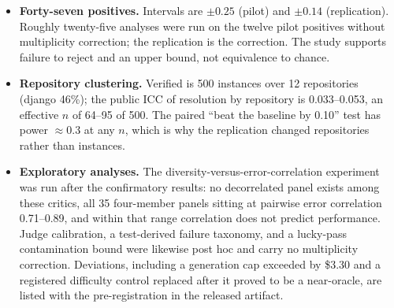 \documentclass[10pt]{article}
\begin{document}
\begin{itemize}[leftmargin=1.2em,itemsep=0pt]
\item \textbf{Forty-seven positives.} Intervals are $\pm0.25$ (pilot) and $\pm0.14$ (replication). Roughly twenty-five analyses were run on the twelve pilot positives without multiplicity correction; the replication is the correction. The study supports failure to reject and an upper bound, not equivalence to chance.
\item \textbf{Repository clustering.} Verified is 500 instances over 12 repositories (django 46\%); the public ICC of resolution by repository is 0.033--0.053, an effective $n$ of 64--95 of 500. The paired ``beat the baseline by 0.10'' test has power $\approx$0.3 at any $n$, which is why the replication changed repositories rather than instances.
\item \textbf{Exploratory analyses.} The diversity-versus-error-correlation experiment was run after the confirmatory results: no decorrelated panel exists among these critics, all 35 four-member panels sitting at pairwise error correlation 0.71--0.89, and within that range correlation does not predict performance. Judge calibration, a test-derived failure taxonomy, and a lucky-pass contamination bound were likewise post hoc and carry no multiplicity correction. Deviations, including a generation cap exceeded by \$3.30 and a registered difficulty control replaced after it proved to be a near-oracle, are listed with the pre-registration in the released artifact.
\end{itemize}
\end{document}

